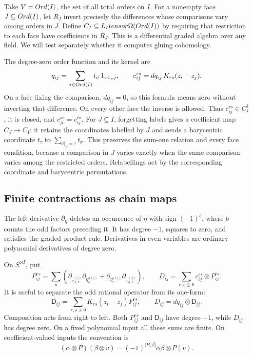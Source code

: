 Take \(V=Ord(I)\), the set of all total orders on \(I\).
For a nonempty face \(J\subseteq Ord(I)\), let \(R_J\) invert
precisely the differences whose comparisons vary among orders in \(J\).
Define \(C_I\subseteq L_Itensor\Omega(Ord(I))\) by requiring
that restriction to each face have coefficients in \(R_J\).
This is a differential graded algebra over any field.  We will test
separately whether it computes gluing cohomology.

The degree-zero order function and its kernel are
\begin{equation}\label{fs:eq:order-kernel}
 q_{ij}=\sum_{\sigma\in Ord(I)}t_\sigma\,1_{i<_\sigma j},
 \qquad c_{ij}^{rs}=dq_{ij}\,K_{rs}(z_i-z_j).
\end{equation}
On a face fixing the comparison, \(dq_{ij}=0\), so this formula
means zero without inverting that difference.  On every other face
the inverse is allowed.  Thus \(c_{ij}^{rs}\in C_I^1\), it is
closed, and \(c_{ji}^{sr}=c_{ij}^{rs}\).
For \(J\subseteq I\), forgetting labels gives a coefficient map
\(C_J\to C_I\): it retains the coordinates labelled by \(J\)
and sends a barycentric coordinate \(t_\tau\) to
\(\sum_{\sigma|_J=\tau}t_\sigma\).
This preserves the sum-one relation and every face condition, because
a comparison in \(J\) varies exactly when the same comparison varies
among the restricted orders.  Relabellings act by the corresponding
coordinate and barycentric permutations.

\subsection{Finite contractions as chain maps}

The left derivative \(\partial_{\eta}\) deletes an occurrence of
\(\eta\) with sign \((-1)^b\), where \(b\) counts the odd
factors preceding it.  It has degree \(-1\), squares to zero,
and satisfies the graded product rule.  Derivatives in even variables
are ordinary polynomial derivatives of degree zero.

On \(S^{\otimes I}\), put
\begin{equation}\label{fs:eq:pair-operators}
 P_{ij}^{rs}=\sum_a\left(
 \partial_{x_{a,r}^{(i)}}\partial_{\eta_s^{a(j)}}+
 \partial_{\eta_r^{a(i)}}\partial_{x_{a,s}^{(j)}}\right),
 \qquad
 D_{ij}=\sum_{r,s\ge0}c_{ij}^{rs}\otimes P_{ij}^{rs}.
\end{equation}
It is useful to separate the odd rational operator from its one-form:
\begin{equation}\label{fs:eq:rational-pair-operator}
 \mathsf D_{ij}=\sum_{r,s\ge0}K_{rs}(z_i-z_j)P_{ij}^{rs},
 \qquad D_{ij}=dq_{ij}\otimes\mathsf D_{ij}.
\end{equation}
Composition acts from right to left.  Both \(P_{ij}^{rs}\) and
\(\mathsf D_{ij}\) have degree \(-1\), while \(D_{ij}\) has
degree zero.  On a fixed polynomial input all
these sums are finite.  On coefficient-valued inputs the convention is
\[
 (\alpha\otimes P)(\beta\otimes v)
 =(-1)^{|P||\beta|}\alpha\beta\otimes P(v).
\]

